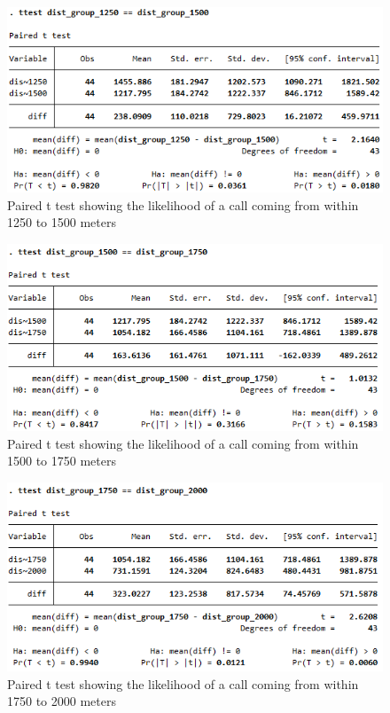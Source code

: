 \documentclass[12pt]{article}
\begin{document}
\begin{figure}
    \centering
    \includegraphics[width=1\linewidth]{image1250-1500.png}
    \caption{Paired t test showing the likelihood of a call coming from within 1250 to 1500 meters}
\end{figure}
\begin{figure}
    \centering
    \includegraphics[width=1\linewidth]{image1500-1750.png}
    \caption{Paired t test showing the likelihood of a call coming from within 1500 to 1750 meters}
\end{figure}
\begin{figure}
    \centering
    \includegraphics[width=1\linewidth]{image1750-2000.png}
    \caption{Paired t test showing the likelihood of a call coming from within 1750 to 2000 meters}
\end{figure}
   
\end{document}
